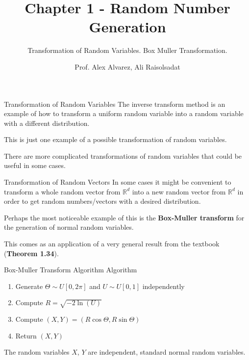 \documentclass[8pt]{beamer}
\title{Chapter 1 - Random Number Generation}
\subtitle{Transformation of Random Variables. Box Muller Transformation.}
\author{Prof. Alex Alvarez, Ali Raisolsadat}
\institute{School of Mathematical and Computational Sciences \\ University of Prince Edward Island}
\date{} %
\begin{document}
\maketitle

\begin{frame}{Transformation of Random Variables}
The inverse transform method is an example of how to transform a uniform random variable into a random variable with a different distribution. 

\vspace{2mm}

This is just one example of a possible transformation of random variables. 

\vspace{2mm}

There are more complicated transformations of random variables
that could be useful in some cases.
\end{frame}

\begin{frame}{Transformation of Random Vectors}
In some cases it might be convenient to transform a whole random vector from $\mathbb{R}^d$ into a new random vector from $\mathbb{R}^d$
in order to get random numbers/vectors with a desired distribution.

\vspace{2mm}

Perhaps the most noticeable example of this is the \textbf{Box-Muller transform} for the generation of normal random variables.

\vspace{2mm}

This comes as an application of a very general result from the textbook (\textbf{Theorem 1.34}).
\end{frame}

\begin{frame}{Box-Muller Transform Algorithm}
\alert{Algorithm}  

\begin{enumerate}
	\item Generate $\Theta \sim U[0,2\pi]$ and $U\sim U[0,1]$ independently
	\item Compute $R=\sqrt{-2\ln(U)}$
	\item Compute $(X,Y)=(R \cos \Theta  , R \sin \Theta)$
	\item Return $(X,Y)$
\end{enumerate}
The random variables $X$, $Y$ are independent, standard normal random variables.
\end{frame}
\end{document}
